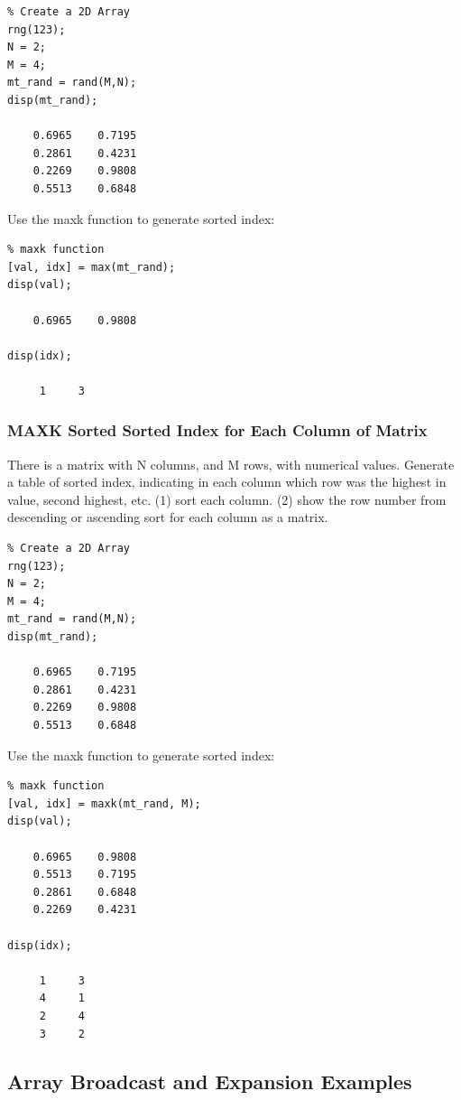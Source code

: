 \documentclass[
]{book}
\begin{document}
\begin{verbatim}
% Create a 2D Array
rng(123);
N = 2;
M = 4;
mt_rand = rand(M,N);
disp(mt_rand);

    0.6965    0.7195
    0.2861    0.4231
    0.2269    0.9808
    0.5513    0.6848
\end{verbatim}

Use the maxk function to generate sorted index:

\begin{verbatim}
% maxk function
[val, idx] = max(mt_rand);
disp(val);

    0.6965    0.9808

disp(idx);

     1     3
\end{verbatim}

\hypertarget{maxk-sorted-sorted-index-for-each-column-of-matrix}{%
\subsubsection{MAXK Sorted Sorted Index for Each Column of Matrix}\label{maxk-sorted-sorted-index-for-each-column-of-matrix}}

There is a matrix with N columns, and M rows, with numerical values.
Generate a table of sorted index, indicating in each column which row
was the highest in value, second highest, etc. (1) sort each column. (2)
show the row number from descending or ascending sort for each column as
a matrix.

\begin{verbatim}
% Create a 2D Array
rng(123);
N = 2;
M = 4;
mt_rand = rand(M,N);
disp(mt_rand);

    0.6965    0.7195
    0.2861    0.4231
    0.2269    0.9808
    0.5513    0.6848
\end{verbatim}

Use the maxk function to generate sorted index:

\begin{verbatim}
% maxk function
[val, idx] = maxk(mt_rand, M);
disp(val);

    0.6965    0.9808
    0.5513    0.7195
    0.2861    0.6848
    0.2269    0.4231

disp(idx);

     1     3
     4     1
     2     4
     3     2
\end{verbatim}

\hypertarget{array-broadcast-and-expansion-examples}{%
\subsection{Array Broadcast and Expansion Examples}\label{array-broadcast-and-expansion-examples}}
\end{document}
